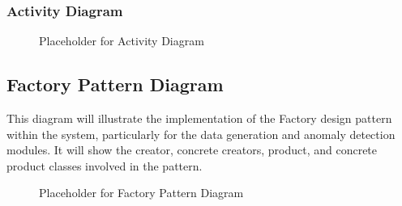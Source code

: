\subsubsection{Activity Diagram}
\begin{figure}[h!]
    \centering
    \caption{Placeholder for Activity Diagram}
    \label{fig:placeholder_activity_diagram}
\end{figure}

\subsection{Factory Pattern Diagram}
This diagram will illustrate the implementation of the Factory design pattern within the system, particularly for the data generation and anomaly detection modules. It will show the creator, concrete creators, product, and concrete product classes involved in the pattern.
\begin{figure}[h!]
    \centering
    \caption{Placeholder for Factory Pattern Diagram}
    \label{fig:placeholder_factory_pattern_diagram}
\end{figure}
